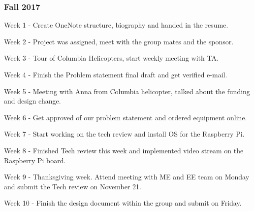 \documentclass[onecolumn, draftclsnofoot,10pt, compsoc]{IEEEtran}
\begin{document}
\subsubsection{Fall 2017}
		\begin{description}
			\item{Week 1} - Create OneNote structure, biography and handed in the resume.
			\item{Week 2} - Project was assigned, meet with the group mates and the sponsor.
			\item{Week 3} - Tour of Columbia Helicopters, start weekly meeting with TA.
            \item{Week 4} - Finish the Problem statement final draft and get verified e-mail.
			\item{Week 5} - Meeting with Anna from Columbia helicopter, talked about the funding and design change. 
			\item{Week 6} - Get approved of our problem statement and ordered equipment online.
            \item{Week 7} - Start working on the tech review and install OS for the Raspberry Pi.
			\item{Week 8} - Finished Tech review this week and implemented video stream on the Raspberry Pi board.
			\item{Week 9} - Thanksgiving week. Attend meeting with ME and EE team on Monday and submit the Tech review on November 21.
            \item{Week 10} - Finish the design document within the group and submit on Friday.
		\end{description}
\end{document}
